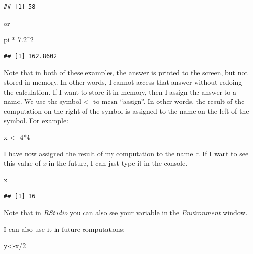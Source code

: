 \documentclass[]{book}
\newenvironment{Shaded}{\begin{snugshade}}{\end{snugshade}}
\newcommand{\DecValTok}[1]{\textcolor[rgb]{0.00,0.00,0.81}{{#1}}}
\newcommand{\FloatTok}[1]{\textcolor[rgb]{0.00,0.00,0.81}{{#1}}}
\newcommand{\StringTok}[1]{\textcolor[rgb]{0.31,0.60,0.02}{{#1}}}
\newcommand{\NormalTok}[1]{{#1}}
\begin{document}
\begin{verbatim}
## [1] 58
\end{verbatim}

or

\begin{Shaded}
\begin{Highlighting}[]
\NormalTok{pi *}\StringTok{ }\FloatTok{7.2}\NormalTok{^}\DecValTok{2}
\end{Highlighting}
\end{Shaded}

\begin{verbatim}
## [1] 162.8602
\end{verbatim}

Note that in both of these examples, the answer is printed to the
screen, but not stored in memory. In other words, I cannot access that
answer without redoing the calculation. If I want to store it in memory,
then I assign the answer to a name. We use the symbol \textless{}- to
mean ``assign''. In other words, the result of the computation on the
right of the symbol is assigned to the name on the left of the symbol.
For example:

\begin{Shaded}
\begin{Highlighting}[]
\NormalTok{x <-}\StringTok{ }\DecValTok{4}\NormalTok{*}\DecValTok{4}
\end{Highlighting}
\end{Shaded}

I have now assigned the result of my computation to the name \emph{x}.
If I want to see this value of \emph{x} in the future, I can just type
it in the console.

\begin{Shaded}
\begin{Highlighting}[]
\NormalTok{x}
\end{Highlighting}
\end{Shaded}

\begin{verbatim}
## [1] 16
\end{verbatim}

Note that in \emph{RStudio} you can also see your variable in the
\emph{Environment} window.

I can also use it in future computations:

\begin{Shaded}
\begin{Highlighting}[]
\NormalTok{y<-x/}\DecValTok{2}
\end{Highlighting}
\end{Shaded}
\end{document}
